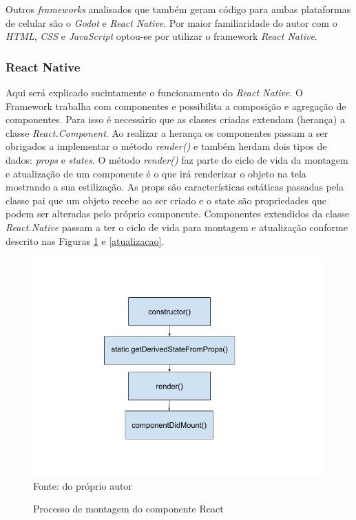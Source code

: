 Outros \textit{frameworks} analisados que também geram código para ambas plataformas de celular são o \textit{Godot} e \textit{React Native}. Por maior familiaridade do autor com o \textit{HTML}, \textit{CSS} e \textit{JavaScript} optou-se por utilizar o framework \textit{React Native}.

\subsubsection[React Native]{React Native}
Aqui será explicado sucintamente o funcionamento do \textit{React Native}. O Framework trabalha com componentes e possibilita a composição e agregação de componentes. Para isso é necessário que as classes criadas extendam (herança) a classe \textit{React.Component}. Ao realizar a herança os componentes passam a ser obrigados a implementar o método \textit{render()} e também herdam dois tipos de dados: \textit{props} e \textit{states}. O método \textit{render()} faz parte do ciclo de vida da montagem e atualização de um componente é o que irá renderizar o objeto na tela mostrando a sua estilização. As props são características estáticas passadas pela classe pai que um objeto recebe ao ser criado e o state são propriedades que podem ser alteradas pelo próprio componente. Componentes extendidos da classe \textit{React.Native} passam a ter o ciclo de vida para montagem e atualização conforme descrito nas Figuras \ref{montagem} e \ref{atualizacao}.


\begin{figure}[H]
\centering
\caption{Processo de montagem do componente React}
\includegraphics[scale=0.2]{figuras/montagem.png}
\label{montagem}
\\
\small{Fonte: do próprio autor}
\end{figure}

